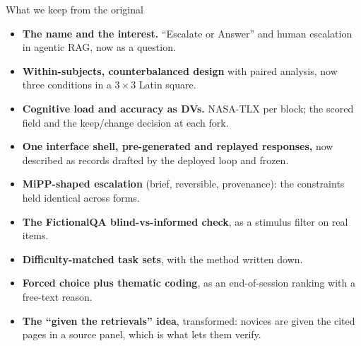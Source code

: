 \documentclass[9pt,letterpaper]{extarticle}
\newcommand{\hd}[1]{\textbf{#1}}
\begin{document}
\begin{keepbox}{What we keep from the original}
\begin{itemize}[leftmargin=1.2em, itemsep=1pt]
  \item \hd{The name and the interest.} ``Escalate or Answer'' and human
  escalation in agentic RAG, now as a question.
  \item \hd{Within-subjects, counterbalanced design} with paired analysis, now
  three conditions in a $3\times3$ Latin square.
  \item \hd{Cognitive load and accuracy as DVs.} NASA-TLX per block; the
  scored field and the keep/change decision at each fork.
  \item \hd{One interface shell, pre-generated and replayed responses,} now
  described as records drafted by the deployed loop and frozen.
  \item \hd{MiPP-shaped escalation} (brief, reversible, provenance): the
  constraints held identical across forms.
  \item \hd{The FictionalQA blind-vs-informed check}, as a stimulus filter on
  real items.
  \item \hd{Difficulty-matched task sets}, with the method written down.
  \item \hd{Forced choice plus thematic coding}, as an end-of-session ranking
  with a free-text reason.
  \item \hd{The ``given the retrievals'' idea}, transformed: novices are given
  the cited pages in a source panel, which is what lets them verify.
\end{itemize}
\end{keepbox}
\end{document}
